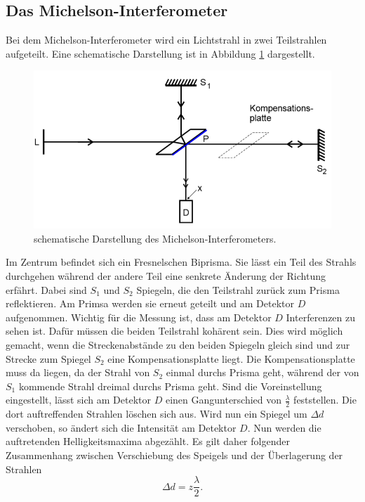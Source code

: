 \subsection{Das Michelson-Interferometer}
Bei dem Michelson-Interferometer wird ein Lichtstrahl in zwei Teilstrahlen aufgeteilt. Eine schematische Darstellung
ist in Abbildung \ref{abb:1} dargestellt.
\begin{figure}[H]
  \includegraphics[width=\textwidth]{content/Aufbau.png}
  \caption{schematische Darstellung des Michelson-Interferometers.\cite{1}}
  \label{abb:1}
\end{figure}
Im Zentrum befindet sich ein Fresnelschen Biprisma. Sie lässt ein Teil des Strahls
durchgehen während der andere Teil eine senkrete Änderung der Richtung erfährt. Dabei sind
$S_1$ und $S_2$ Spiegeln, die den Teilstrahl zurück zum Prisma reflektieren.
Am Primsa werden sie erneut geteilt und am Detektor $D$ aufgenommen.
Wichtig für die Messung ist, dass am Detektor $D$ Interferenzen zu sehen ist.
Dafür müssen die beiden Teilstrahl kohärent sein. Dies wird möglich gemacht,
wenn die Streckenabstände zu den beiden Spiegeln gleich sind und zur Strecke zum Spiegel $S_2$ eine
Kompensationsplatte liegt. Die Kompensationsplatte muss da liegen, da der Strahl von $S_2$ einmal durchs
Prisma geht, während der von $S_1$ kommende Strahl dreimal durchs Prisma geht.
Sind die Voreinstellung eingestellt, lässt sich am Detektor $D$ einen Gangunterschied von $\frac{\lambda}{2}$ feststellen.
Die dort auftreffenden Strahlen löschen sich aus. Wird nun ein Spiegel um $\Delta d$ verschoben,
so ändert sich die Intensität am Detektor $D$. Nun werden die auftretenden Helligkeitsmaxima abgezählt.
Es gilt daher folgender Zusammenhang zwischen Verschiebung des Speigels und der Überlagerung der Strahlen
\begin{equation}
  \Delta d = z \frac{\lambda}{2}.
  \label{eq:1}
\end{equation}
